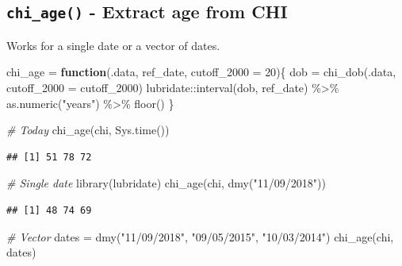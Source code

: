 \documentclass[
]{book}
\newenvironment{Shaded}{\begin{snugshade}}{\end{snugshade}}
\newcommand{\AttributeTok}[1]{\textcolor[rgb]{0.77,0.63,0.00}{#1}}
\newcommand{\CommentTok}[1]{\textcolor[rgb]{0.56,0.35,0.01}{\textit{#1}}}
\newcommand{\ControlFlowTok}[1]{\textcolor[rgb]{0.13,0.29,0.53}{\textbf{#1}}}
\newcommand{\DecValTok}[1]{\textcolor[rgb]{0.00,0.00,0.81}{#1}}
\newcommand{\FunctionTok}[1]{\textcolor[rgb]{0.00,0.00,0.00}{#1}}
\newcommand{\NormalTok}[1]{#1}
\newcommand{\OtherTok}[1]{\textcolor[rgb]{0.56,0.35,0.01}{#1}}
\newcommand{\SpecialCharTok}[1]{\textcolor[rgb]{0.00,0.00,0.00}{#1}}
\newcommand{\StringTok}[1]{\textcolor[rgb]{0.31,0.60,0.02}{#1}}
\begin{document}
\hypertarget{chi_age---extract-age-from-chi}{%
\subsection{\texorpdfstring{\texttt{chi\_age()} - Extract age from CHI}{chi\_age() - Extract age from CHI}}\label{chi_age---extract-age-from-chi}}

Works for a single date or a vector of dates.

\begin{Shaded}
\begin{Highlighting}[]
\NormalTok{chi\_age }\OtherTok{=} \ControlFlowTok{function}\NormalTok{(.data, ref\_date, }\AttributeTok{cutoff\_2000 =} \DecValTok{20}\NormalTok{)\{}
\NormalTok{  dob }\OtherTok{=} \FunctionTok{chi\_dob}\NormalTok{(.data, }\AttributeTok{cutoff\_2000 =}\NormalTok{ cutoff\_2000)}
\NormalTok{  lubridate}\SpecialCharTok{::}\FunctionTok{interval}\NormalTok{(dob, ref\_date) }\SpecialCharTok{\%\textgreater{}\%} 
    \FunctionTok{as.numeric}\NormalTok{(}\StringTok{"years"}\NormalTok{) }\SpecialCharTok{\%\textgreater{}\%} 
    \FunctionTok{floor}\NormalTok{()}
\NormalTok{\}}

\CommentTok{\# Today}
\FunctionTok{chi\_age}\NormalTok{(chi, }\FunctionTok{Sys.time}\NormalTok{())}
\end{Highlighting}
\end{Shaded}

\begin{verbatim}
## [1] 51 78 72
\end{verbatim}

\begin{Shaded}
\begin{Highlighting}[]
\CommentTok{\# Single date}
\FunctionTok{library}\NormalTok{(lubridate)}
\FunctionTok{chi\_age}\NormalTok{(chi, }\FunctionTok{dmy}\NormalTok{(}\StringTok{"11/09/2018"}\NormalTok{))}
\end{Highlighting}
\end{Shaded}

\begin{verbatim}
## [1] 48 74 69
\end{verbatim}

\begin{Shaded}
\begin{Highlighting}[]
\CommentTok{\# Vector}
\NormalTok{dates }\OtherTok{=} \FunctionTok{dmy}\NormalTok{(}\StringTok{"11/09/2018"}\NormalTok{,}
            \StringTok{"09/05/2015"}\NormalTok{,}
            \StringTok{"10/03/2014"}\NormalTok{)}
\FunctionTok{chi\_age}\NormalTok{(chi, dates)}
\end{Highlighting}
\end{Shaded}
\end{document}
